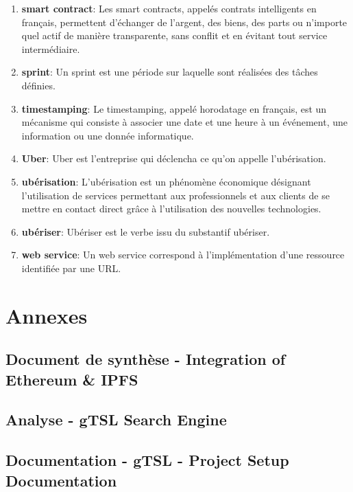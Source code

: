 \documentclass{tnreport}
\begin{document}
\begin{enumerate}
	\item \textbf{smart contract}: Les smart contracts, appelés contrats intelligents en français, permettent d'échanger de l'argent, des biens, des parts ou n'importe quel actif de manière transparente, sans conflit et en évitant tout service intermédiaire.
	\item \textbf{sprint}: Un sprint est une période sur laquelle sont réalisées des tâches définies.
	\item \textbf{timestamping}: Le timestamping, appelé horodatage en français, est un mécanisme qui consiste à associer une date et une heure à un événement, une information ou une donnée informatique.
	\item \textbf{Uber}: Uber est l'entreprise qui déclencha ce qu'on appelle l'ubérisation.
	\item \textbf{ubérisation}: L'ubérisation est un phénomène économique désignant l'utilisation de services permettant aux professionnels et aux clients de se mettre en contact direct grâce à l'utilisation des nouvelles technologies.
	\item \textbf{ubériser}: Ubériser est le verbe issu du substantif ubériser.
	\item \textbf{web service}: Un web service correspond à l'implémentation d'une ressource identifiée par une URL.
\end{enumerate}

\cleardoublepage
\renewcommand{\thesubsection}{\Roman{subsection}}

\appendix
\part*{Annexes}
\clearpage

\chapter{Document de synthèse - Integration of Ethereum \& IPFS}
\label{anx:ipfs-ethereum}

\clearpage

\chapter{Analyse - gTSL Search Engine}
\label{anx:gtsl-search-engine}

\clearpage

\chapter{Documentation - gTSL - Project Setup Documentation}
\label{anx:gtsl-setup}

\clearpage
\end{document}
